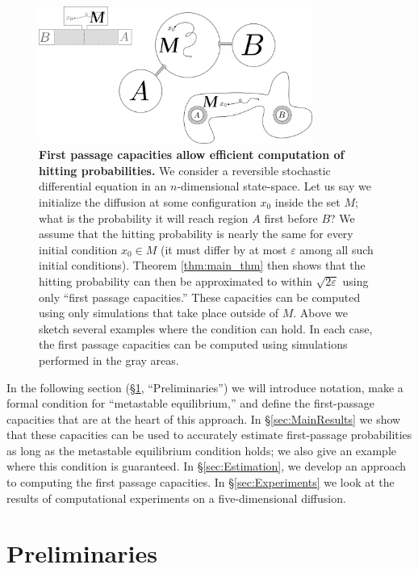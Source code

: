 \documentclass[12pt, nofootinbib,english, amsmath, amssymb, aps, priprint, graphicx,floatfix]{revtex4-1}
\theoremstyle{plain}
\theoremstyle{definition}
\theoremstyle{plain}
\begin{document}
\begin{figure}
    \centering  \includegraphics[width=0.8\textwidth]{bigpicture.png}
    \caption{\footnotesize\linespread{1.}\selectfont{} {\bf First passage capacities allow efficient computation of hitting probabilities.} We consider a reversible stochastic differential equation in an $n$-dimensional state-space.  Let us say we initialize the diffusion at some configuration $x_0$ inside the set $M$; what is the probability it will reach region $A$ first before $B$?  We assume that the hitting probability is nearly the same for every initial condition $x_0 \in M$ (it must differ by at most $\varepsilon$ among all such initial conditions).  Theorem \ref{thm:main_thm} then shows that the hitting probability can then be approximated to within $\sqrt{2\varepsilon}$ using only ``first passage capacities.'' These capacities can be computed using only simulations that take place outside of $M$.  Above we sketch several examples where the condition can hold.  In each case, the first passage capacities can be computed using simulations performed in the gray areas.}
\label{fig:ToyModel}
\end{figure}

In the following section (\S\ref{sec:Preliminaries}, ``Preliminaries'') we will introduce notation, make a formal condition for ``metastable equilibrium,'' and define the first-passage capacities that are at the heart of this approach.  In \S\ref{sec:MainResults} we show that these capacities can be used to accurately estimate first-passage probabilities as long as the metastable equilibrium condition holds; we also give an example where this condition is guaranteed.  In \S\ref{sec:Estimation}, we develop an approach to computing the first passage capacities.   In \S\ref{sec:Experiments} we look at the results of computational experiments on a five-dimensional diffusion.  


\section{Preliminaries}
\label{sec:Preliminaries}
\end{document}

